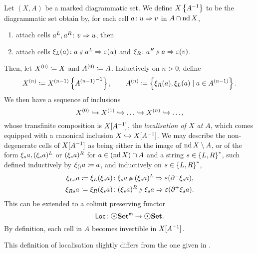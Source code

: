 \begin{dfn}
    Let \( (X, A) \) be a marked diagrammatic set.
    We define \( \preloc{X}{A} \) to be the diagrammatic set obtain by, for each cell \( a \colon u \celto v \) in \( A \cap \nd X \),
    \begin{enumerate}
        \item attach cells \( a^L, a^R  \colon v \celto u \), then
        \item attach cells \( \hinv{L}(a) \colon a \cp{} a^L \celto \un(u) \) and \( \hinv{R} \colon a^R \cp{} a \celto \un(v) \).
    \end{enumerate} 
    Then, let \( \order{0}{X} \eqdef X \) and \( \order{0}{A} \eqdef A \).
    Inductively on \( n > 0 \), define
    \begin{equation*}
        \order{n}{X} \eqdef \preloc{\order{n - 1}{X}}{\order{n - 1}{A}}, \quad\quad \order{n}{A} \eqdef \set{\hinv{R}(a), \hinv{L}(a) \mid a \in \order{n - 1}{A}}.
    \end{equation*}
    We then have a sequence of inclusions
    \begin{equation*}
        \order{0}{X} \incl \order{1}{X} \incl \ldots \incl \order{n}{X} \incl \ldots,
    \end{equation*}
    whose transfinite composition is \( \loc{X}{A} \), the \emph{localisation of \( X \) at \( A \)}, which comes equipped with a canonical inclusion \( X \incl \loc{X}{A} \).
    We may describe the non-degenerate cells of \( \loc{X}{A} \) as being either in the image of \( \nd X \setminus A \), or of the form \( \hinv{s}a, (\hinv{s}a)^L \) or \( (\hinv{s}a)^R \) for \( a \in (\nd X) \cap A \) and a string \( s \in \set{L, R}^* \), such defined inductively by \( \hinv{\langle\rangle} a \eqdef a \), and inductively on \( s \in \set{L, R}^* \),
    \begin{align*}
        \hinv{Ls}a \eqdef \hinv{L}(\hinv{s}a) &\colon \hinv{s}a \cp{} (\hinv{s}a)^L \celto \un(\bd{}{-}\hinv{s}a),\\
        \hinv{Rs}a \eqdef \hinv{R}(\hinv{s}a) &\colon (\hinv{s}a)^R \cp{} \hinv{s}a \celto \un(\bd{}{+}\hinv{s}a).
    \end{align*}
    This can be extended to a colimit preserving functor
    \begin{equation*}
        \Loc \colon \mdgmSet \to \dgmSet.
    \end{equation*}
    By definition, each cell in \( A \) becomes invertible in \( \loc{X}{A} \).
\end{dfn}

\begin{rmk}
    This definition of localisation slightly differs from the one given in \cite[2.38]{chanavat2024model}.
\end{rmk}

